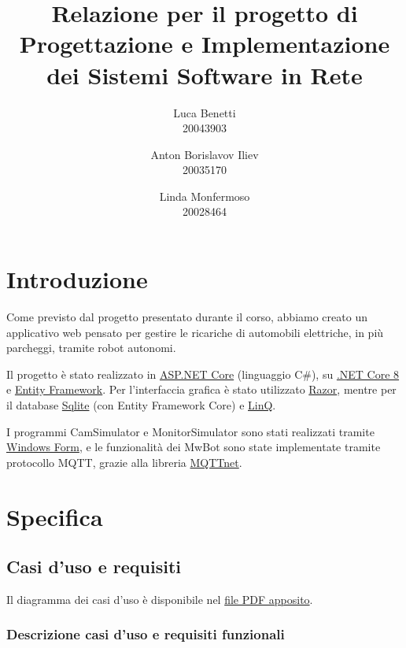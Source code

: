 \documentclass{article}
\title{Relazione per il progetto di Progettazione e Implementazione dei Sistemi Software in Rete}
\author{
  Luca Benetti\\
  20043903
  \and
  Anton Borislavov Iliev\\
  20035170
  \and
  Linda Monfermoso\\
  20028464
}
\begin{document}
\maketitle

\section{Introduzione}
Come previsto dal progetto presentato durante il corso, abbiamo creato un applicativo web pensato per gestire le ricariche di automobili elettriche, in più parcheggi, tramite robot autonomi.

Il progetto è stato realizzato in \href{https://dotnet.microsoft.com/en-us/apps/aspnet}{ASP.NET Core} (linguaggio C\#), su \href{https://dotnet.microsoft.com/en-us/download/dotnet/8.0}{.NET Core 8} e \href{https://learn.microsoft.com/en-us/aspnet/entity-framework}{Entity Framework}. Per l'interfaccia grafica è stato utilizzato \href{https://learn.microsoft.com/en-us/aspnet/core/razor-pages/?view=aspnetcore-8.0&tabs=visual-studio}{Razor}, mentre per il database \href{https://www.sqlite.org/index.html}{Sqlite} (con Entity Framework Core) e \href{https://learn.microsoft.com/en-us/dotnet/csharp/linq/}{LinQ}.

I programmi CamSimulator e MonitorSimulator sono stati realizzati tramite \href{https://learn.microsoft.com/en-us/visualstudio/ide/create-csharp-winform-visual-studio?view=vs-2022}{Windows Form}, e le funzionalità dei MwBot sono state implementate tramite protocollo MQTT, grazie alla libreria \href{https://github.com/dotnet/MQTTnet}{MQTTnet}.
\section{Specifica}
\subsection{Casi d'uso e requisiti}
Il diagramma dei casi d'uso è disponibile nel \href{run:./casi d'uso.pdf}{file PDF apposito}.
\subsubsection{Descrizione casi d'uso e requisiti funzionali}
\end{document}
